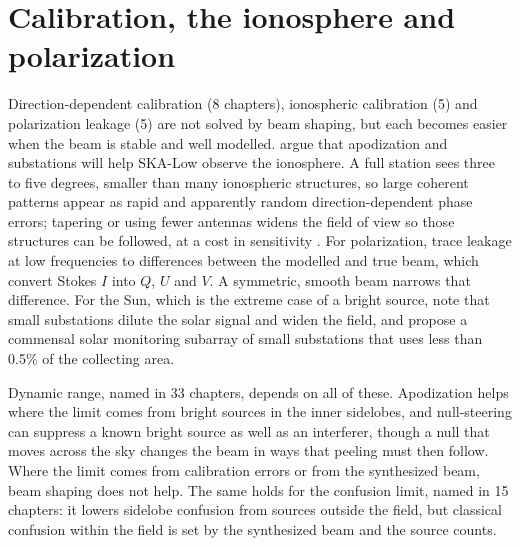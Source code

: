 \documentclass[11pt,a4paper]{article}
\begin{document}
\section{Calibration, the ionosphere and polarization}

Direction-dependent calibration (8 chapters), ionospheric calibration (5) and polarization leakage (5) are not solved by beam shaping, but each becomes easier when the beam is stable and well modelled. \citet{Datta2026} argue that apodization and substations will help SKA-Low observe the ionosphere. A full station sees three to five degrees, smaller than many ionospheric structures, so large coherent patterns appear as rapid and apparently random direction-dependent phase errors; tapering or using fewer antennas widens the field of view so those structures can be followed, at a cost in sensitivity \citep{Datta2026,Mort2017,Trott2024}. For polarization, \citet{Patra2026} trace leakage at low frequencies to differences between the modelled and true beam, which convert Stokes $I$ into $Q$, $U$ and $V$. A symmetric, smooth beam narrows that difference. For the Sun, which is the extreme case of a bright source, \citet{Oberoi2026} note that small substations dilute the solar signal and widen the field, and propose a commensal solar monitoring subarray of small substations that uses less than 0.5\% of the collecting area.

Dynamic range, named in 33 chapters, depends on all of these. Apodization helps where the limit comes from bright sources in the inner sidelobes, and null-steering can suppress a known bright source as well as an interferer, though a null that moves across the sky changes the beam in ways that peeling must then follow. Where the limit comes from calibration errors or from the synthesized beam, beam shaping does not help. The same holds for the confusion limit, named in 15 chapters: it lowers sidelobe confusion from sources outside the field, but classical confusion within the field is set by the synthesized beam and the source counts.
\end{document}
